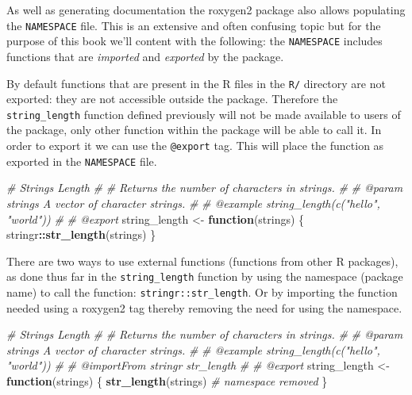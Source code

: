 \documentclass[
]{krantz}
\makeatletter
\newenvironment{Shaded}{\begin{snugshade}}{\end{snugshade}}
\newcommand{\CommentTok}[1]{\textcolor[rgb]{0.37,0.37,0.37}{\textit{#1}}}
\newcommand{\ControlFlowTok}[1]{\textcolor[rgb]{0.27,0.27,0.27}{\textbf{#1}}}
\newcommand{\KeywordTok}[1]{\textcolor[rgb]{0.27,0.27,0.27}{\textbf{#1}}}
\newcommand{\NormalTok}[1]{#1}
\newcommand{\OperatorTok}[1]{\textcolor[rgb]{0.43,0.43,0.43}{\textbf{#1}}}
\newcommand{\StringTok}[1]{\textcolor[rgb]{0.5,0.5,0.5}{#1}}
\newenvironment{kframe}{%
\medskip{}
\setlength{\fboxsep}{.8em}
 \def\at@end@of@kframe{}%
 \ifinner\ifhmode%
  \def\at@end@of@kframe{\end{minipage}}%
  \begin{minipage}{\columnwidth}%
 \fi\fi%
 \def\FrameCommand##1{\hskip\@totalleftmargin \hskip-\fboxsep
 \colorbox{shadecolor}{##1}\hskip-\fboxsep
     \hskip-\linewidth \hskip-\@totalleftmargin \hskip\columnwidth}%
 \MakeFramed {\advance\hsize-\width
   \@totalleftmargin\z@ \linewidth\hsize
   \@setminipage}}%
 {\par\unskip\endMakeFramed%
 \at@end@of@kframe}
\renewenvironment{Shaded}{\begin{kframe}}{\end{kframe}}
\makeatother
\begin{document}
As well as generating documentation the roxygen2 package also allows populating the \texttt{NAMESPACE} file. This is an extensive and often confusing topic but for the purpose of this book we'll content with the following: the \texttt{NAMESPACE} includes functions that are \emph{imported} and \emph{exported} by the package.

By default functions that are present in the R files in the \texttt{R/} directory are not exported: they are not accessible outside the package. Therefore the \texttt{string\_length} function defined previously will not be made available to users of the package, only other function within the package will be able to call it. In order to export it we can use the \texttt{@export} tag. This will place the function as exported in the \texttt{NAMESPACE} file.

\begin{Shaded}
\begin{Highlighting}[]
\CommentTok{\#\textquotesingle{} Strings Length}
\CommentTok{\#\textquotesingle{} }
\CommentTok{\#\textquotesingle{} Returns the number of characters in strings. }
\CommentTok{\#\textquotesingle{} }
\CommentTok{\#\textquotesingle{} @param strings A vector of character strings.}
\CommentTok{\#\textquotesingle{} }
\CommentTok{\#\textquotesingle{} @example string\_length(c("hello", "world"))}
\CommentTok{\#\textquotesingle{} }
\CommentTok{\#\textquotesingle{} @export}
\NormalTok{string\_length <{-}}\StringTok{ }\ControlFlowTok{function}\NormalTok{(strings) \{}
\NormalTok{  stringr}\OperatorTok{::}\KeywordTok{str\_length}\NormalTok{(strings)}
\NormalTok{\}}
\end{Highlighting}
\end{Shaded}

There are two ways to use external functions (functions from other R packages), as done thus far in the \texttt{string\_length} function by using the namespace (package name) to call the function: \texttt{stringr::str\_length}. Or by importing the function needed using a roxygen2 tag thereby removing the need for using the namespace.

\begin{Shaded}
\begin{Highlighting}[]
\CommentTok{\#\textquotesingle{} Strings Length}
\CommentTok{\#\textquotesingle{} }
\CommentTok{\#\textquotesingle{} Returns the number of characters in strings. }
\CommentTok{\#\textquotesingle{} }
\CommentTok{\#\textquotesingle{} @param strings A vector of character strings.}
\CommentTok{\#\textquotesingle{} }
\CommentTok{\#\textquotesingle{} @example string\_length(c("hello", "world"))}
\CommentTok{\#\textquotesingle{} }
\CommentTok{\#\textquotesingle{} @importFrom stringr str\_length}
\CommentTok{\#\textquotesingle{} }
\CommentTok{\#\textquotesingle{} @export}
\NormalTok{string\_length <{-}}\StringTok{ }\ControlFlowTok{function}\NormalTok{(strings) \{}
  \KeywordTok{str\_length}\NormalTok{(strings) }\CommentTok{\# namespace removed}
\NormalTok{\}}
\end{Highlighting}
\end{Shaded}
\end{document}
